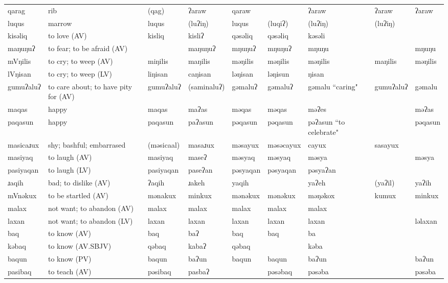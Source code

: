 \begin{landscape}
\begin{longtable}{*{9}{p{}}}
\text{*}qarag & rib & (qag) & ʔaraw & qaraw &  & ʔaraw & ʔaraw & ʔaraw\\
\text{*}luqus & marrow & luqus & (luʔiŋ) & luqus & (luqiʔ) & (luʔiŋ) & (luʔiŋ) & \\
\text{*}kisəliq & to love (AV) & kisliq & kisliʔ & qəsəliq & qəsəliq & kəsəli &  & \\
\text{*}maŋuŋuʔ & to fear; to be afraid (AV) &  & maŋuŋuʔ & mŋuŋuʔ & mŋuŋuʔ & mŋuŋu &  & mŋuŋu\\
\text{*}mVŋilis & to cry; to weep (AV) & miŋilis & maŋilis & məŋilis & məŋilis & məŋilis & maŋilis & məŋilis\\
\text{*}lVŋisan & to cry; to weep (LV) & liŋisan & caŋisan & ləŋisan & ləŋisun & ŋisan &  & \\
\text{*}gumuʔaluʔ & to care about; to have pity for (AV) & gumuʔaluʔ & (saminaluʔ) & gəmaluʔ & gəmaluʔ & gəmalu ``caring" & gumuʔaluʔ & gəmalu\\
\text{*}maqas & happy & maqas & maʔas & məqas & məqas & məʔes &  & məʔas\\
\text{*}paqasun & happy & paqasun & paʔasun & pəqasun & pəqasun & pəʔasun ``to celebrate" &  & pəqasun\\
\text{*}masicaɹux & shy; bashful; embarrased & (məsicaal) & masaɹux & məsayux & məsəcayux & cayux & sasayux & \\
\text{*}masiyaq & to laugh (AV) & masiyaq & maseʔ & məsyaq & məsyaq & məsya &  & məsya\\
\text{*}pasiyaqan & to laugh (LV) & pasiyaqan & paseʔan & pəsyaqan & pəsyaqan & pəsyaʔan &  & \\
\text{*}ɹaqih & bad; to dislike (AV) & ʔaqih & ɹakeh & yaqih &  & yaʔeh & (yaʔil) & yaʔih\\
\text{*}mVnəkux & to be startled (AV) & mənakux & minkux & mənəkux & mənəkux & məŋəkox & kumux & minkux\\
\text{*}malax & not want; to abandon (AV) & malax & malax & malax & malax & malax &  & \\
\text{*}laxan & not want; to abandon (LV) & laxan & laxan & laxan & laxan & laxan &  & ləlaxan\\
\text{*}baq & to know (AV) & baq & baʔ & baq & baq & ba &  & \\
\text{*}kəbaq & to know (AV.SBJV) & qəbaq & kabaʔ & qəbaq &  & kəba &  & \\
\text{*}baqun & to know (PV) & baqun & baʔun & baqun & baqun & baʔun &  & baʔun\\
\text{*}pasibaq & to teach (AV) & pəsibaq & pasbaʔ &  & pəsəbaq & pəsəba &  & pəsəba\\

\end{longtable}
\end{landscape}

